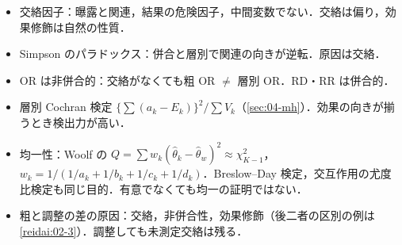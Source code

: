 \begin{summarybox}
\begin{itemize}
\item 交絡因子：曝露と関連，結果の危険因子，中間変数でない．交絡は偏り，効果修飾は自然の性質．
\item Simpson のパラドックス：併合と層別で関連の向きが逆転．原因は交絡．
\item OR は非併合的：交絡がなくても粗 OR $\ne$ 層別 OR．RD・RR は併合的．
\item 層別 Cochran 検定 $\{\sum(a_k-E_k)\}^2/\sum V_k$（\cref{sec:04-mh}）．効果の向きが揃うとき検出力が高い．
\item 均一性：Woolf の $Q=\sum w_k(\hat\theta_k-\hat\theta_w)^2\approx\chi^2_{K-1}$，$w_k=1/(1/a_k+1/b_k+1/c_k+1/d_k)$．Breslow--Day 検定，交互作用の尤度比検定も同じ目的．有意でなくても均一の証明ではない．
\item 粗と調整の差の原因：交絡，非併合性，効果修飾（後二者の区別の例は\cref{reidai:02-3}）．調整しても未測定交絡は残る．
\end{itemize}
\end{summarybox}
